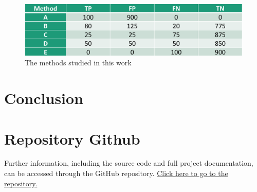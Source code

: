 \documentclass{llncs}
\begin{document}
\begin{figure}[h!]
	\begin{center}  %
		\includegraphics[width=1\textwidth]{images/dataset.png}
		\caption{The methods studied in this work}
		\label{fig:dataset}
	\end{center}
\end{figure}

\vspace{-20pt} %



\section{Conclusion}


\section{Repository Github}
Further information, including the source code and full project documentation, can be accessed through the GitHub repository.  \href{https://github.com/Diegodepab/Supervised_Learning_Model_Evaluation_Metrics}{Click here to go to the repository.} 



\end{document}
